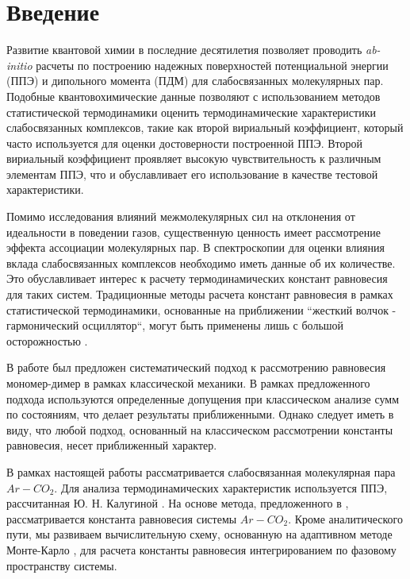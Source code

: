 \section{Введение}
Развитие квантовой химии в последние десятилетия позволяет проводить \textit{ab-initio} расчеты по построению надежных поверхностей потенциальной энергии (ППЭ) и дипольного момента (ПДМ) для слабосвязанных молекулярных пар. Подобные квантовохимические данные позволяют с использованием методов статистической термодинамики оценить термодинамические характеристики слабосвязанных комплексов, такие как второй вириальный коэффициент, который часто используется для оценки достоверности построенной ППЭ. Второй вириальный коэффициент проявляет высокую чувствительность к различным элементам ППЭ, что и обуславливает его использование в качестве тестовой характеристики. \par
 Помимо исследования влияний межмолекулярных сил на отклонения от идеальности в поведении газов, существенную ценность имеет рассмотрение эффекта ассоциации молекулярных пар. В спектроскопии для оценки влияния вклада слабосвязанных комплексов необходимо иметь данные об их количестве. Это обуславливает интерес к расчету термодинамических констант равновесия для таких систем. Традиционные методы расчета констант равновесия в рамках статистической термодинамики, основанные на приближении ``жесткий волчок - гармонический осциллятор``, могут быть применены лишь с большой осторожностью \cite{camyvigasin}. \par
В работе \cite{vigasin2015} был предложен систематический подход к рассмотрению равновесия мономер-димер в рамках классической механики. В рамках предложенного подхода используются определенные допущения при классическом анализе сумм по состояниям, что делает результаты приближенными. Однако следует иметь в виду, что любой подход, основанный на классическом рассмотрении константы равновесия, несет приближенный характер. \par
В рамках настоящей работы рассматривается слабосвязанная молекулярная пара $Ar-CO_2$. Для анализа термодинамических характеристик используется ППЭ, рассчитанная Ю. Н. Калугиной \cite{kalugina2017}. На основе метода, предложенного в \cite{vigasin2015}, рассматривается константа равновесия системы $Ar-CO_2$. Кроме аналитического пути, мы развиваем вычислительную схему, основанную на адаптивном методе Монте-Карло \cite{lepage1978, vegas}, для расчета константы равновесия интегрированием по фазовому пространству системы. 
